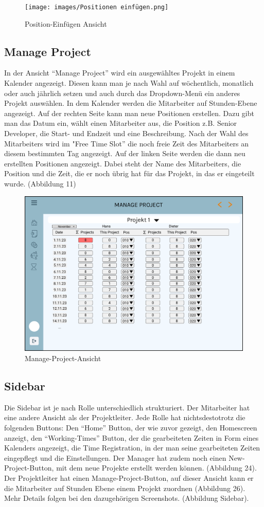 \documentclass{article}
\begin{document}
\begin{figure}[h]
    \texttt{[image: images/Positionen einfügen.png]}
    \caption{Position-Einfügen Ansicht}
    \label{fig:beispiel}
\end{figure}

\subsection{Manage Project}
In der Ansicht “Manage Project” wird ein ausgewähltes Projekt in einem Kalender
angezeigt. Diesen kann man je nach Wahl auf wöchentlich, monatlich oder auch
jährlich setzen und auch durch das Dropdown-Menü ein anderes Projekt auswählen.
In dem Kalender werden die Mitarbeiter auf Stunden-Ebene angezeigt. Auf der
rechten Seite kann man neue Positionen erstellen. Dazu gibt man das Datum ein,
wählt einen Mitarbeiter aus, die Position z.B. Senior Developer, die Start- und
Endzeit und eine Beschreibung. Nach der Wahl des Mitarbeiters wird im "Free
Time Slot” die noch freie Zeit des Mitarbeiters an diesem bestimmten Tag
angezeigt. Auf der linken Seite werden die dann neu erstellten Positionen
angezeigt. Dabei steht der Name des Mitarbeiters, die Position und die Zeit,
die er noch übrig hat für das Projekt, in das er eingeteilt wurde. (Abbildung
11)

\begin{figure}[h]
    \includegraphics[height= 0.5\textwidth,width= \textwidth]{images/ManageProject1.png}
    \caption{Manage-Project-Ansicht}
    \label{fig:beispiel}
\end{figure}

\newpage

\subsection{Sidebar}
Die Sidebar ist je nach Rolle unterschiedlich strukturiert. Der Mitarbeiter hat
eine andere Ansicht als der Projektleiter. Jede Rolle hat nichtsdestotrotz die
folgenden Buttons: Den “Home” Button, der wie zuvor gezeigt, den Homescreen
anzeigt, den “Working-Times” Button, der die gearbeiteten Zeiten in Form eines
Kalenders angezeigt, die Time Registration, in der man seine gearbeiteten
Zeiten eingepflegt und die Einstellungen. Der Manager hat zudem noch einen
New-Project-Button, mit dem neue Projekte erstellt werden können. (Abbildung
24). Der Projektleiter hat einen Manage-Project-Button, auf dieser Ansicht kann
er die Mitarbeiter auf Stunden Ebene einem Projekt zuordnen (Abbildung 26).
Mehr Details folgen bei den dazugehörigen Screenshots. (Abbildung Sidebar).
\end{document}
